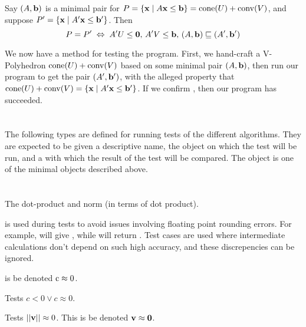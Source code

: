 \begin{EqCriteria}\label{eq_vp_hp}
	Say $(A,\mathbf{b})$ is a minimal pair for $P = \left\{\mathbf{x}\;|\; A\mathbf{x}\leq \mathbf{b}\right\} = \operatorname{cone}(U) + \operatorname{conv}(V)$, and suppose $P' = \left\{\mathbf{x}\;|\; A'\mathbf{x}\leq \mathbf{b}'\right\}$.  Then
	\[ P = P' \;\Leftrightarrow\; A'U\leq\mathbf{0},\, A'V\leq\mathbf{b},\, (A,\mathbf{b})\sqsubseteq (A',\mathbf{b}')\]
\end{EqCriteria}

\begin{Test}\label{test_vp_to_hp}
	We now have a method for testing the program.  First, we hand-craft a V-Polyhedron $\operatorname{cone}(U) + \operatorname{conv}(V)$ based on some minimal pair $(A,\mathbf{b})$, then run our program to get the pair $(A',\mathbf{b}')$, with the alleged property that $\operatorname{cone}(U) + \operatorname{conv}(V) = \left\{\mathbf{x}\;|\; A'\mathbf{x}\leq \mathbf{b}'\right\}$.  If we confirm , then our program has succeeded.
\end{Test}

\section{}

The following types are defined for running tests of the different algorithms.  They are expected to be given a descriptive name, the object on which the test will be run, and a  with which the result of the test will be compared.  The  object is one of the minimal objects described above.
\lsthconetestcasea
\lstvconetestcasea
\lsthpolytestcaseb
\lstvpolytestcaseb

\section{}

The dot-product and norm (in terms of dot product).
\lstoperator
\lstnorm

 is used during tests to avoid issues involving floating point rounding errors.  For example,  will give , while  will return .  Test cases are used where intermediate calculations don't depend on such high accuracy, and these discrepencies can be ignored.

 is be denoted $\mli{c} \approx 0$.
\lstapproximatelyzeroa

Tests $c < 0 \lor c \approx 0$.
\lstapproximatelyltzero

Tests $\left|\left|\mathbf{v}\right|\right| \approx 0$.  This is be denoted $\mathbf{v} \approx \mathbf{0}$.
\lstapproximatelyzerob

